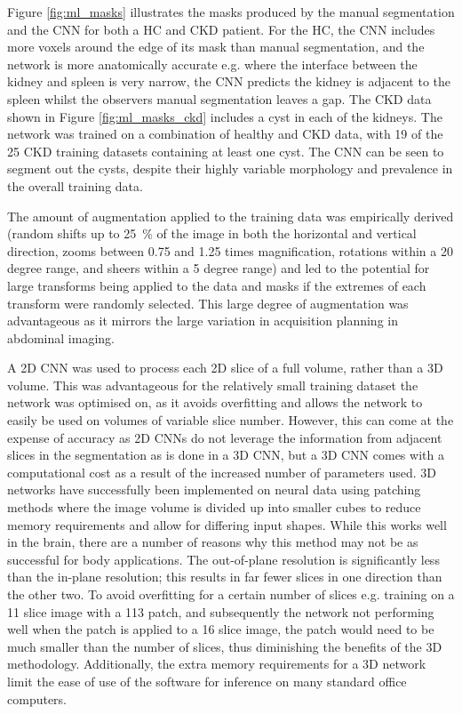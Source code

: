 Figure \ref{fig:ml_masks} illustrates the masks produced by the manual segmentation and the \ac{CNN} for both a \ac{HC} and \ac{CKD} patient. For the \ac{HC}, the \ac{CNN} includes more voxels around the edge of its mask than manual segmentation, and the network is more anatomically accurate e.g. where the interface between the kidney and spleen is very narrow, the \ac{CNN} predicts the kidney is adjacent to the spleen whilst the observers manual segmentation leaves a gap. The \ac{CKD} data shown in Figure \ref{fig:ml_masks_ckd} includes a cyst in each of the kidneys. The network was trained on a combination of healthy and \ac{CKD} data, with 19 of the 25 \ac{CKD} training datasets containing at least one cyst. The \ac{CNN} can be seen to segment out the cysts, despite their highly variable morphology and prevalence in the overall training data.
 
The amount of augmentation applied to the training data was empirically derived (random shifts up to 25~\% of the image in both the horizontal and vertical direction, zooms between 0.75 and 1.25 times magnification, rotations within a 20 degree range, and sheers within a 5 degree range) and led to the potential for large transforms being applied to the data and masks if the extremes of each transform were randomly selected. This large degree of augmentation was advantageous as it mirrors the large variation in acquisition planning in abdominal imaging. 

A 2D \ac{CNN} was used to process each 2D slice of a full volume, rather than a 3D volume. This was advantageous for the relatively small training dataset the network was optimised on, as it avoids overfitting and allows the network to easily be used on volumes of variable slice number. However, this can come at the expense of accuracy as 2D \ac{CNN}s do not leverage the information from adjacent slices in the segmentation as is done in a 3D \ac{CNN}, but a 3D \ac{CNN} comes with a computational cost as a result of the increased number of parameters used. 3D networks have successfully been implemented on neural data using patching methods where the image volume is divided up into smaller cubes \cite{wachinger_deepnat_2018} to reduce memory requirements and allow for differing input shapes. While this works well in the brain, there are a number of reasons why this method may not be as successful for body applications. The out-of-plane resolution is significantly less than the in-plane resolution; this results in far fewer slices in one direction than the other two. To avoid overfitting for a certain number of slices e.g. training on a 11 slice image with a 113 patch, and subsequently the network not performing well when the patch is applied to a 16 slice image, the patch would need to be much smaller than the number of slices, thus diminishing the benefits of the 3D methodology. Additionally, the extra memory requirements for a 3D network limit the ease of use of the software for inference on many standard office computers.

